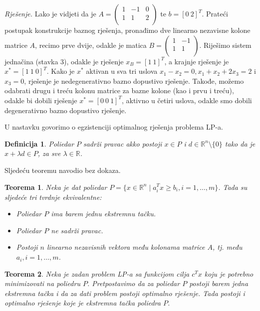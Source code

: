 \documentclass[a4paper, utf8, 11pt, colorlinks]{article}
\newtheorem{definition}{Definicija}
\newtheorem{thm}{Teorema}
\begin{document}
\emph{Rješenje.} Lako je vidjeti da je  
$A=\left (\begin{array}{ccc}
   1  & -1 & 0  \\
   1  &  1 & 2 \\
\end{array} \right )$ te $b = [0\ 2]^T$. Prateći postupak konstrukcije baznog rješenja, pronađimo dve linearno nezavisne kolone matrice $A$, recimo prve dvije, odakle je matica $B=\left (\begin{array}{cc}
   1  & -1    \\
   1  &  1   \\
\end{array} \right ) .$ Riješimo sistem jednačina (stavka 3), odakle je rješenje $x_B = [1\ 1]^T$, a krajnje rješenje je $x^* = [1\ 1\ 0]^T$. Kako je 
$x^*$ aktivan u sva tri uslova $x_1 - x_2 = 0, x_1 + x_2 + 2 x_3 = 2$ i $x_3 = 0$, rješenje je nedegenerativno bazno dopustivo rješenje.  Takođe, možemo odabrati drugu i treću kolonu matrice za bazne kolone (kao i prvu i treću), odakle bi dobili rješenje $x^* = [0\ 0\ 1]^T$, aktivno u četiri uslova, odakle smo dobili degenerativno bazno dopustivo rješenje. 


U nastavku govorimo o egzistenciji optimalnog rješenja problema LP-a.

\begin{definition}
      Poliedar $P$ sadrži pravac akko postoji $x \in P$ i $d \in \mathbb{R}^n \setminus \{0\}$ tako da je $x + \lambda d \in P$, za sve $\lambda \in \mathbb{R}$. 
\end{definition}

Sljedeću teoremu navodio bez dokaza.

\begin{thm}
   Neka je dat poliedar $P=\{ x \in \mathbb{R}^n  \mid a_i^T x \geq b_i, i=1,\ldots,m\} $. Tada su sljedeće tri tvrdnje ekvivalentne:
   \begin{itemize}
       \item  Poliedar $P$ ima barem jednu ekstremnu tačku.
       \item Poliedar $P$ ne sadrži pravac.
       \item Postoji $n$ linearno nezavisnih vektora  među kolonama matrice $A$, tj. među $a_i, i=1,\ldots,m$.
   \end{itemize}
\end{thm}

\begin{thm}
   Neka je zadan problem LP-a sa funkcijom cilja $c^Tx$ koju je potrebno minimizovati na poliedru $P$. Pretpostavimo da za poliedar $P$ postoji barem jedna ekstremna tačka i da za dati problem postoji optimalno rješenje. Tada postoji i optimalno rješenje koje je ekstremna tačka poliedra $P$.
\end{thm}
\end{document}
